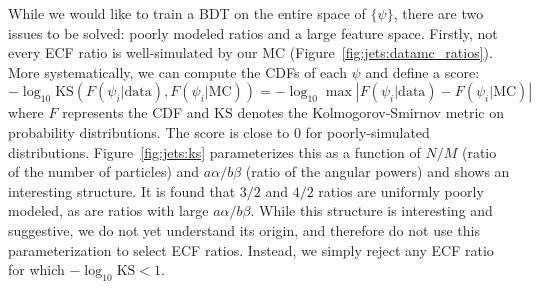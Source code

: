 While we would like to train a BDT on the entire space of $\{\psi\}$, there are two issues to be solved: poorly modeled ratios and a large feature space.
Firstly, not every ECF ratio is well-simulated by our MC (Figure~\ref{fig:jets:datamc_ratios}).
More systematically, we can compute the CDFs of each $\psi$ and define a score: 
\begin{equation}
    -\log_{10} \mathrm{KS}(F(\psi_i | \mathrm{data}), F(\psi_i | \mathrm{MC})) = -\log_{10} \max \left|F(\psi_i | \mathrm{data}) - F(\psi_i | \mathrm{MC})\right|
\end{equation}
where $F$ represents the CDF and $\mathrm{KS}$ denotes the Kolmogorov-Smirnov metric on probability distributions.
The score is close to 0 for poorly-simulated distributions.
Figure~\ref{fig:jets:ks} parameterizes this as a function of $N/M$ (ratio of the number of particles) and $a\alpha/b\beta$ (ratio of the angular powers) and shows an interesting structure.
It is found that $3/2$ and $4/2$ ratios are uniformly poorly modeled, as are ratios with large $a\alpha/b\beta$. 
While this structure is interesting and suggestive, we do not yet understand its origin, and therefore do not use this parameterization to select ECF ratios.
Instead, we simply reject any ECF ratio for which $-\log_{10}\mathrm{KS} < 1$. 

